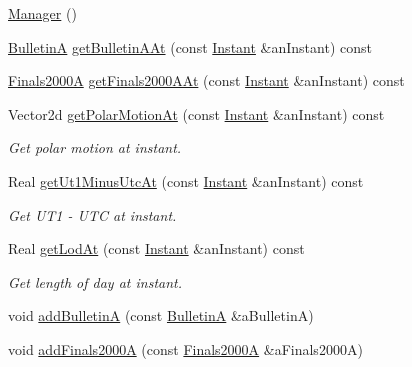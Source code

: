 \begin{DoxyCompactItemize}
\item 
\hyperlink{classlibrary_1_1physics_1_1coord_1_1frame_1_1provider_1_1iers_1_1_manager_a8be831f65e5851152337a19de02cf23d}{Manager} ()
\item 
\hyperlink{classlibrary_1_1physics_1_1coord_1_1frame_1_1provider_1_1iers_1_1_bulletin_a}{BulletinA} \hyperlink{classlibrary_1_1physics_1_1coord_1_1frame_1_1provider_1_1iers_1_1_manager_ab6d7d7f3bdbf9d982a8507aa2455d6ca}{get\+Bulletin\+A\+At} (const \hyperlink{classlibrary_1_1physics_1_1time_1_1_instant}{Instant} \&an\+Instant) const
\item 
\hyperlink{classlibrary_1_1physics_1_1coord_1_1frame_1_1provider_1_1iers_1_1_finals2000_a}{Finals2000A} \hyperlink{classlibrary_1_1physics_1_1coord_1_1frame_1_1provider_1_1iers_1_1_manager_a7e419906c184e80e78b1538c929b9fc1}{get\+Finals2000\+A\+At} (const \hyperlink{classlibrary_1_1physics_1_1time_1_1_instant}{Instant} \&an\+Instant) const
\item 
Vector2d \hyperlink{classlibrary_1_1physics_1_1coord_1_1frame_1_1provider_1_1iers_1_1_manager_a3023a701ae8b2abf5a93e9c0c46db37a}{get\+Polar\+Motion\+At} (const \hyperlink{classlibrary_1_1physics_1_1time_1_1_instant}{Instant} \&an\+Instant) const
\begin{DoxyCompactList}\small\item\em Get polar motion at instant. \end{DoxyCompactList}\item 
Real \hyperlink{classlibrary_1_1physics_1_1coord_1_1frame_1_1provider_1_1iers_1_1_manager_a67749dc760378bc56c82cc752833e4d9}{get\+Ut1\+Minus\+Utc\+At} (const \hyperlink{classlibrary_1_1physics_1_1time_1_1_instant}{Instant} \&an\+Instant) const
\begin{DoxyCompactList}\small\item\em Get U\+T1 -\/ U\+TC at instant. \end{DoxyCompactList}\item 
Real \hyperlink{classlibrary_1_1physics_1_1coord_1_1frame_1_1provider_1_1iers_1_1_manager_a4d8b3d53fb06128050357682ee09d816}{get\+Lod\+At} (const \hyperlink{classlibrary_1_1physics_1_1time_1_1_instant}{Instant} \&an\+Instant) const
\begin{DoxyCompactList}\small\item\em Get length of day at instant. \end{DoxyCompactList}\item 
void \hyperlink{classlibrary_1_1physics_1_1coord_1_1frame_1_1provider_1_1iers_1_1_manager_a754e24a455c15f7d954718b0e6821e49}{add\+BulletinA} (const \hyperlink{classlibrary_1_1physics_1_1coord_1_1frame_1_1provider_1_1iers_1_1_bulletin_a}{BulletinA} \&a\+BulletinA)
\item 
void \hyperlink{classlibrary_1_1physics_1_1coord_1_1frame_1_1provider_1_1iers_1_1_manager_a28affac9f1340a79fc0f100af5105c42}{add\+Finals2000A} (const \hyperlink{classlibrary_1_1physics_1_1coord_1_1frame_1_1provider_1_1iers_1_1_finals2000_a}{Finals2000A} \&a\+Finals2000A)
\end{DoxyCompactItemize}


